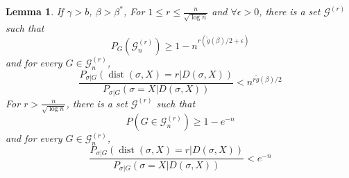 \documentclass[journal]{IEEEtran}
\newtheorem{lemma}{Lemma}
\newcommand{\cG}{\mathcal{G}}
\newcommand{\1}{\mathbbm{1}}
\DeclareMathOperator{\dist}{dist}
\begin{document}
\begin{lemma}\label{prop:small}
	If $\gamma>b$, $\beta>\beta^\ast$,
	For $1\leq r \leq \frac{n}{\sqrt{\log n}}$
	and $\forall \epsilon > 0$, there is a set $\cG^{(r)}$ such that
	\begin{equation}\label{eq:Gr}
	P_G(\cG^{(r)}_n) \ge 1 - n^{r(\tilde{g}(\beta)/2 + \epsilon)}
	\end{equation}
	and
	for every $G\in\cG^{(r)}_n$,
	\begin{equation}\label{eq:psigmaX}
	\frac{P_{\sigma|G}(\dist(\sigma, X)=r | D(\sigma, X))}
	{P_{\sigma|G}(\sigma=X | D(\sigma, X))} <
	n^{r \tilde{g}(\beta) /2}
	\end{equation}
	For $r> \frac{n}{\sqrt{\log n}}$, there is a set $\cG^{(r)}$ such that
	\begin{equation}\label{eq:Gr1}
	P(G\in\cG^{(r)}_n) \ge 1 - e^{-n}
	\end{equation}
	and
	for every $G\in\cG^{(r)}_n$,
	\begin{equation}\label{eq:psigmaX1}
	\frac{P_{\sigma|G}(\dist(\sigma, X)=r | D(\sigma, X))}
	{P_{\sigma|G}(\sigma=X | D(\sigma, X))} <
	e^{-n}
	\end{equation}
\end{lemma}
\end{document}
